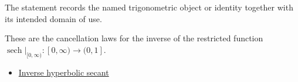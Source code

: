 \begin{remark*}[Interpretation]
The statement records the named trigonometric object or identity together with
its intended domain of use.
\end{remark*}

\begin{remark*}[Proof]
These are the cancellation laws for the inverse of the restricted function
$\operatorname{sech}|_{[0,\infty)}:[0,\infty)\to(0,1]$.
\end{remark*}
\begin{dependencies}
\begin{itemize}
  \item \hyperref[def:inverse-hyperbolic-secant]{Inverse hyperbolic secant}
\end{itemize}
\end{dependencies}
